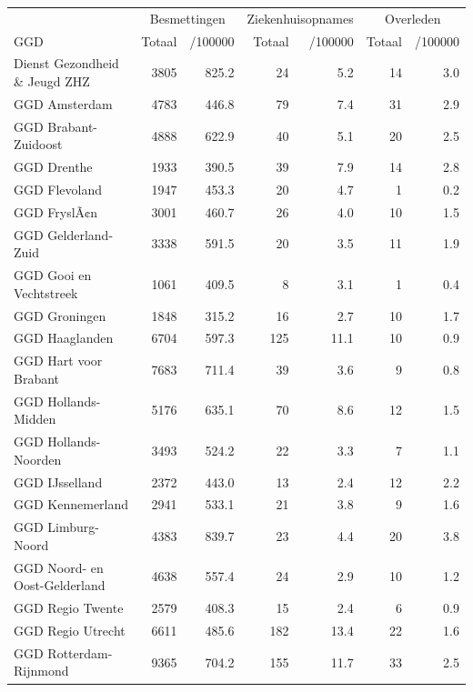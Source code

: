 \documentclass[
  english,
  man,floatsintext]{apa6}
\begin{document}
\begin{table}
\centering\begingroup\fontsize{10}{12}\selectfont

\begin{threeparttable}
\begin{tabular}{lrrrrrr}
\toprule
\multicolumn{1}{c}{ } & \multicolumn{2}{c}{Besmettingen} & \multicolumn{2}{c}{Ziekenhuisopnames} & \multicolumn{2}{c}{Overleden} \\
\cmidrule(l{3pt}r{3pt}){2-3} \cmidrule(l{3pt}r{3pt}){4-5} \cmidrule(l{3pt}r{3pt}){6-7}
GGD & Totaal & /100000 & Totaal & /100000 & Totaal & /100000\\
\midrule
Dienst Gezondheid \& Jeugd ZHZ & 3805 & 825.2 & 24 & 5.2 & 14 & 3.0\\
GGD Amsterdam & 4783 & 446.8 & 79 & 7.4 & 31 & 2.9\\
GGD Brabant-Zuidoost & 4888 & 622.9 & 40 & 5.1 & 20 & 2.5\\
GGD Drenthe & 1933 & 390.5 & 39 & 7.9 & 14 & 2.8\\
GGD Flevoland & 1947 & 453.3 & 20 & 4.7 & 1 & 0.2\\
GGD FryslÃ¢n & 3001 & 460.7 & 26 & 4.0 & 10 & 1.5\\
GGD Gelderland-Zuid & 3338 & 591.5 & 20 & 3.5 & 11 & 1.9\\
GGD Gooi en Vechtstreek & 1061 & 409.5 & 8 & 3.1 & 1 & 0.4\\
GGD Groningen & 1848 & 315.2 & 16 & 2.7 & 10 & 1.7\\
GGD Haaglanden & 6704 & 597.3 & 125 & 11.1 & 10 & 0.9\\
GGD Hart voor Brabant & 7683 & 711.4 & 39 & 3.6 & 9 & 0.8\\
GGD Hollands-Midden & 5176 & 635.1 & 70 & 8.6 & 12 & 1.5\\
GGD Hollands-Noorden & 3493 & 524.2 & 22 & 3.3 & 7 & 1.1\\
GGD IJsselland & 2372 & 443.0 & 13 & 2.4 & 12 & 2.2\\
GGD Kennemerland & 2941 & 533.1 & 21 & 3.8 & 9 & 1.6\\
GGD Limburg-Noord & 4383 & 839.7 & 23 & 4.4 & 20 & 3.8\\
GGD Noord- en Oost-Gelderland & 4638 & 557.4 & 24 & 2.9 & 10 & 1.2\\
GGD Regio Twente & 2579 & 408.3 & 15 & 2.4 & 6 & 0.9\\
GGD Regio Utrecht & 6611 & 485.6 & 182 & 13.4 & 22 & 1.6\\
GGD Rotterdam-Rijnmond & 9365 & 704.2 & 155 & 11.7 & 33 & 2.5\\

\end{tabular}
\end{threeparttable}
\end{table}
\end{document}
